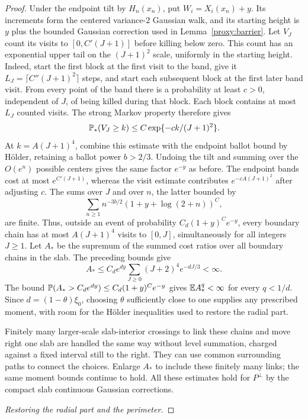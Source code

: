 \begin{proof}
Under the endpoint tilt by $H_n(x_n)$, put $W_i=X_i(x_n)+y$.
Its increments form the centered variance-$2$ Gaussian walk, and its
starting height is $y$ plus the bounded Gaussian correction used in
Lemma~\ref{proxy:barrier}.  Let $V_J$ count its visits to
$[0,C'(J+1)]$ before killing below zero.  This count has an exponential
upper tail on the $(J+1)^2$ scale, uniformly in the starting height.
Indeed, start the first block at the first visit to the band, give it
$L_J=\lceil C''(J+1)^2\rceil$ steps, and start each subsequent block at the
first later band visit.  From every point of the band there is a
probability at least $c>0$, independent of $J$, of being killed during that
block.
Each block contains at most $L_J$ counted visits.  The strong Markov property
therefore gives
\[
 \mathbb P_*(V_J\geq k)\leq C\exp\{-ck/(J+1)^2\}.
\]
At $k=A(J+1)^4$, combine this estimate with the endpoint ballot bound by
H\"older, retaining a ballot power $b>2/3$.  Undoing the tilt and summing over
the $O(e^n)$ possible centers gives the same factor $e^{-y}$ as before.
The endpoint bands cost at most $e^{C'(J+1)}$, whereas the visit estimate
contributes $e^{-cA(J+1)^2}$ after adjusting $c$.  The sums over $J$ and over
$n$, the latter bounded by
\[
 \sum_{n\geq1}n^{-3b/2}(1+y+\log(2+n))^C,
\]
are finite.  Thus, outside an event of probability
$C_d(1+y)^Ce^{-y}$, every boundary chain has at most $A(J+1)^4$ visits to
$[0,J]$, simultaneously for all integers $J\geq1$.
Let $A_*$ be the supremum of the summed cost ratios over all boundary
chains in the slab.  The preceding bounds give
\[
 A_*\leq C_d e^{dy}\sum_{J\geq0}(J+2)^4e^{-dJ/3}<\infty.
\]
The bound $\mathbb P(A_*>C_de^{dy})\leq C_d(1+y)^Ce^{-y}$ gives
$\mathbb E A_*^q<\infty$ for every $q<1/d$.  Since $d=(1-\theta)\xi_0$, choosing
$\theta$ sufficiently close to one supplies any prescribed moment, with
room for the H\"older inequalities used to restore the radial part.

Finitely many larger-scale slab-interior crossings to link these chains and move right one slab are handled the same way without level summation, charged against a fixed interval still to the right.
They can use common surrounding paths to connect the choices.
Enlarge $A_*$ to include these finitely many links; the same moment bounds
continue to hold.
All these estimates hold for \(P^\perp\) by the compact slab continuous Gaussian corrections.

\smallskip\noindent\textit{Restoring the radial part and the perimeter.}\quad


\end{proof}
